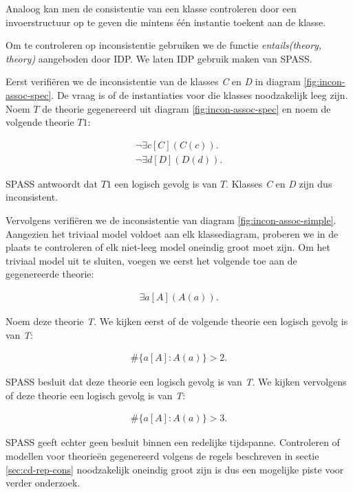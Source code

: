 Analoog kan men de consistentie van een klasse controleren door een invoerstructuur op te geven die mintens \'e\'en instantie toekent aan de klasse.

Om te controleren op inconsistentie gebruiken we de functie \textit{entails(theory, theory)} aangeboden door IDP\cite{DeCatBroes2014PLaa}. We laten IDP gebruik maken van SPASS\cite{SPASS}.

Eerst verifi\"eren we de inconsistentie van de klasses \textit{C} en \textit{D} in diagram \ref{fig:incon-assoc-spec}. De vraag is of de instantiaties voor die klasses noodzakelijk leeg zijn. Noem $T$ de theorie gegenereerd uit diagram \ref{fig:incon-assoc-spec} en noem de volgende theorie $T1$:

\begin{align*}
	\lnot{}\exists{c}[C](C(c)). \\
	\lnot{}\exists{d}[D](D(d)).
\end{align*}

SPASS antwoordt dat $T1$ een logisch gevolg is van $T$. Klasses \textit{C} en \textit{D} zijn dus inconsistent.

Vervolgens verifi\"eren we de inconsistentie van diagram \ref{fig:incon-assoc-simple}. Aangezien het triviaal model voldoet aan elk klassediagram, proberen we in de plaats te controleren of elk niet-leeg model oneindig groot moet zijn. Om het triviaal model uit te sluiten, voegen we eerst het volgende toe aan de gegenereerde theorie:

\begin{align*}
	\exists{a}[A](A(a)).
\end{align*}

Noem deze theorie \textit{T}. We kijken eerst of de volgende theorie een logisch gevolg is van \textit{T}:

\begin{align*}
	\#\{a [A] : A(a)\} > 2.
\end{align*}

SPASS besluit dat deze theorie een logisch gevolg is van \textit{T}. We kijken vervolgens of deze theorie een logisch gevolg is van \textit{T}:

\begin{align*}
\#\{a [A] : A(a)\} > 3.
\end{align*}

SPASS geeft echter geen besluit binnen een redelijke tijdspanne. Controleren of modellen voor theorie\"en gegenereerd volgens de regels beschreven in sectie \ref{sec:cd-rep-cons} noodzakelijk oneindig groot zijn is dus een mogelijke piste voor verder onderzoek.